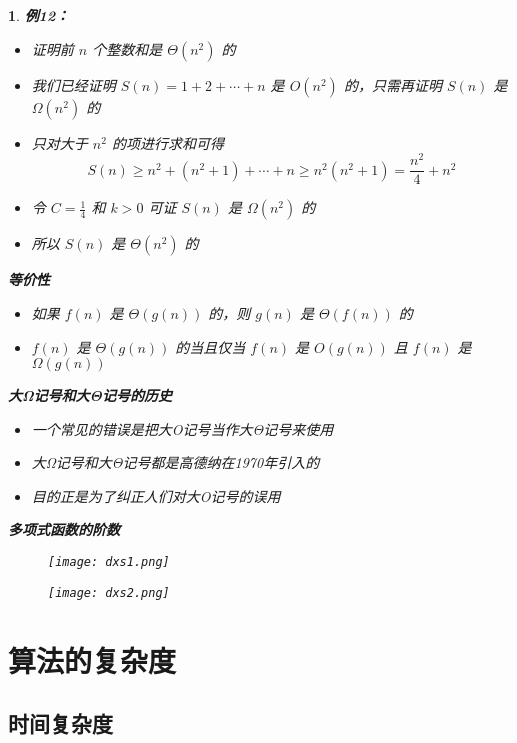 \documentclass[UTF8]{report}
\theoremstyle{MyLineTheoremStyle} %
\theoremstyle{MyBlockTheoremStyle} %
\theoremstyle{MySubsubsectionStyle} %
\newtheorem{definition}{}
\begin{document}
\begin{definition}
    \textbf{例12：}
    \begin{itemize}
        \item 证明前 $n$ 个整数和是 $\Theta(n^2)$ 的
        \item 我们已经证明 $S(n) = 1 + 2 + \cdots + n$ 是 $O(n^2)$ 的，只需再证明 $S(n)$ 是 $\Omega(n^2)$ 的
        \item 只对大于 $n^2$ 的项进行求和可得
        \[
        S(n) \geq n^2 + \left(n^2 + 1\right) + \cdots + n \geq n^2 \left(n^2 + 1\right) = \frac{n^2}{4} + n^2
        \]
        \item 令 $C = \frac{1}{4}$ 和 $k > 0$ 可证 $S(n)$ 是 $\Omega(n^2)$ 的
        \item 所以 $S(n)$ 是 $\Theta(n^2)$ 的
    \end{itemize}

    \textbf{等价性}
    \begin{itemize}
        \item 如果 $f(n)$ 是 $\Theta(g(n))$ 的，则 $g(n)$ 是 $\Theta(f(n))$ 的
        \item $f(n)$ 是 $\Theta(g(n))$ 的当且仅当 $f(n)$ 是 $O(g(n))$ 且 $f(n)$ 是 $\Omega(g(n))$
    \end{itemize}

    \textbf{大Ω记号和大Θ记号的历史}
    \begin{itemize}
        \item 一个常见的错误是把大O记号当作大Θ记号来使用
        \item 大Ω记号和大Θ记号都是高德纳在1970年引入的
        \item 目的正是为了纠正人们对大O记号的误用
    \end{itemize}

    \textbf{多项式函数的阶数}
    \begin{figure}[ht]
        \centering
        \texttt{[image: dxs1.png]}
    \end{figure}
    \begin{figure}[ht]
        \centering
        \texttt{[image: dxs2.png]}
    \end{figure}
\end{definition}

\section{算法的复杂度}

\subsection{时间复杂度}
\end{document}
